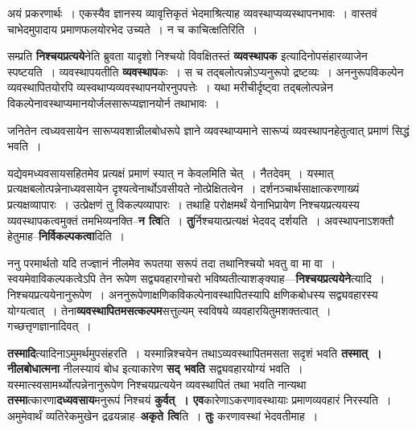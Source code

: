 \documentclass[article,12pt,a4paper]{memoir}
\begin{document}
	  \pstart अयं प्रकरणार्थः । एकस्यैव ज्ञानस्य व्यावृत्तिकृतं भेदमाश्रित्याह व्यवस्थाप्यव्यस्थापनभावः । वास्तवं चाभेदमुपादाय प्रमाणफलयोरभेद उच्यते । न च काचित्क्षतिरिति ।
	\pend
      

	  \pstart सम्प्रति \textbf{निश्चयप्रत्यये}नेति ब्रुवता यादृशो निश्चयो विवक्षितस्तं \textbf{व्यवस्थापक} इत्यादिनोपसंहारव्याजेन स्पष्टयति । व्यवस्थापयतीति \textbf{व्यवस्थाप}कः । स च तद्बलोत्पन्नोऽप्यनुरूपो द्रष्टव्यः । अननुरूपविकल्पेन व्यवस्थापितयोरपि व्यस्वथाप्यव्यवस्थापनयोरनुपपत्तेः । यथा मरीचीर्दृष्ट्वा तद्बलोत्पन्नेन विकल्पेनावस्थाप्यमानयोर्जलसारूप्यज्ञानयोर्न तथाभावः ।  \leavevmode{} 
	  
	जनितेन त्वध्यवसायेन सारूप्यवशान्नीलबोधरूपे ज्ञाने व्यवस्थाप्यमाने सारूप्यं व्यवस्थापनहेतुत्वात् प्रमाणं सिद्धं भवति ।  
	  
	यद्येवमध्यवसायसहितमेव प्रत्यक्षं प्रमाणं स्यात् न केवलमिति चेत् । नैतदेवम् । यस्मात् प्रत्यक्षबलोत्पन्नेनाध्यवसायेन दृश्यत्वेनार्थोऽवसीयते नोत्प्रेक्षितत्वेन । दर्शनञ्चार्थसाक्षात्करणाख्यं प्रत्यक्षव्यापारः । उत्प्रेक्षणं तु विकल्पव्यापारः । तथाहि परोक्षमर्थं येनाभिप्रायेण निश्चयप्रत्ययस्य व्यवस्थापकत्वमुक्तं तमभिव्यनक्ति--\textbf{न त्वि}ति । \textbf{तु}र्निश्चयात्प्रत्यक्षं भेदवद् दर्शयति । अवस्थापनाऽशक्तौ हेतुमाह--\textbf{निर्विकल्पकत्वा}दिति ।
	\pend
      

	  \pstart ननु परमार्थतो यदि तज्ज्ञानं नीलमेव रूपतया सरूपं तदा तथानिश्चयो भवतु वा मा वा । स्वयमेवाविकल्पकत्वेऽपि तेन रूपेण सद्व्यवहारगोचरो भविष्यतीत्याशङ्क्याह—\textbf{निश्चयप्रत्ययेने}त्यादि । निश्चयप्रत्ययेनानुरूपेण । अननुरूपेणाक्षणिकविकल्पेनावस्थापितस्यापि क्षणिकबोधस्य सद्व्यवहारस्य योग्यत्वात् । तेना\textbf{व्यवस्थापितमसत्कल्पम}सत्तुल्यम् स्वविषये व्यवहारयितुमशक्तत्वा\leavevmode{}त् । गच्छत्तृणज्ञानादिवत् ।
	\pend
      

	  \pstart \textbf{तस्मादि}त्यादिनाऽमुमर्थमुपसंहरति । यस्मान्निश्चयेन तथाऽव्यवस्थापितमसता सदृशं भवति \textbf{तस्मात् । नीलबोधात्मना} नीलस्यायं बोध इत्याकारेण \textbf{सद् भवति} सद्व्यवहारयोग्यं भवति । यस्मात्स्वसामर्थ्योत्पन्नेनानुरूपेण निश्चयप्रत्ययेन व्यवस्थापितं तथा भवति नान्यथा \textbf{तस्मा}त्कारणा\textbf{दध्यवसाय}मनुरूपं निश्चयं \textbf{कुर्वत् । एव}कारेणाऽकरणावस्थायाः प्रमाणव्यवहारं निरस्यति । अमुमेवार्थं व्यतिरेकमुखेन द्रढयन्नाह--\textbf{अकृते त्वि}ति । \textbf{तुः} करणावस्थां भेदवतीमाह ।
	\pend
      
\end{document}
